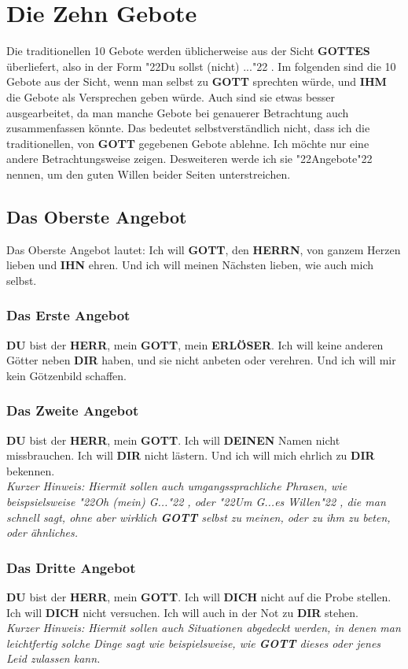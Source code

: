 \documentclass[10pt,a5paper]{article}
\newcommand{\Deinen}[0]{\textbf{DEINEN}}
\newcommand{\Dich}[0]{\textbf{DICH}}
\newcommand{\Dir}[0]{\textbf{DIR}}
\newcommand{\Du}[0]{\textbf{DU}}
\newcommand{\Erloeser}[0]{\textbf{ERL\"OSER}}
\newcommand{\Gottes}[0]{\textbf{GOTTES}}
\newcommand{\Gott}[0]{\textbf{GOTT}}
\newcommand{\Herrn}[0]{\textbf{HERRN}}
\newcommand{\Herr}[0]{\textbf{HERR}}
\newcommand{\Ihm}[0]{\textbf{IHM}}
\newcommand{\Ihn}[0]{\textbf{IHN}}
\newcommand{\q}[1]{\char"22{#1}\char"22 }
\begin{document}
	\newpage
	\section{Die Zehn Gebote}
		Die traditionellen 10 Gebote werden \"ublicherweise aus der Sicht {\Gottes} \"uberliefert,
		also in der Form \q{Du sollst (nicht) ...}.
		Im folgenden sind die 10 Gebote aus der Sicht,
		wenn man selbst zu {\Gott} sprechten w\"urde,
		und {\Ihm} die Gebote als Versprechen geben w\"urde.
		Auch sind sie etwas besser ausgearbeitet,
		da man manche Gebote bei genauerer Betrachtung auch zusammenfassen k\"onnte.
		Das bedeutet selbstverst\"andlich nicht,
		dass ich die traditionellen,
		von {\Gott} gegebenen Gebote ablehne.
		Ich m\"ochte nur eine andere Betrachtungsweise zeigen.
		Desweiteren werde ich sie \q{Angebote} nennen,
		um den guten Willen beider Seiten unterstreichen.
	
	\subsection{Das Oberste Angebot}
		Das Oberste Angebot lautet:
		Ich will {\Gott}, den {\Herrn}, von ganzem Herzen lieben und {\Ihn} ehren. Und ich will meinen N\"achsten lieben, wie auch mich selbst.
		
	\subsubsection{Das Erste Angebot}
		{\Du} bist der {\Herr},
		mein {\Gott},
		mein {\Erloeser}.
		Ich will keine anderen G\"otter neben {\Dir} haben,
		und sie nicht anbeten oder verehren.
		Und ich will mir kein G\"otzenbild schaffen.
		
	\subsubsection{Das Zweite Angebot}
		{\Du} bist der {\Herr},
		mein {\Gott}.
		Ich will {\Deinen} Namen nicht missbrauchen.
		Ich will {\Dir} nicht l\"astern.
		Und ich will mich ehrlich zu {\Dir} bekennen.
		\\
		\textit{Kurzer Hinweis:
		Hiermit sollen auch umgangssprachliche Phrasen,
		wie beispsielsweise \q{Oh (mein) G...},
		oder \q{Um G...es Willen},
		die man schnell sagt,
		ohne aber wirklich {\Gott} selbst zu meinen,
		oder zu ihm zu beten,
		oder \"ahnliches.}
			
	\subsubsection{Das Dritte Angebot}
		{\Du} bist der {\Herr},
		mein {\Gott}.
		Ich will {\Dich} nicht auf die Probe stellen.
		Ich will {\Dich} nicht versuchen.
		Ich will auch in der Not zu {\Dir} stehen.
		\\
		\textit{Kurzer Hinweis:
		Hiermit sollen auch Situationen abgedeckt werden,
		in denen man leichtfertig solche Dinge sagt wie beispielsweise,
		wie {\Gott} dieses oder jenes Leid zulassen kann.}
		
\end{document}
